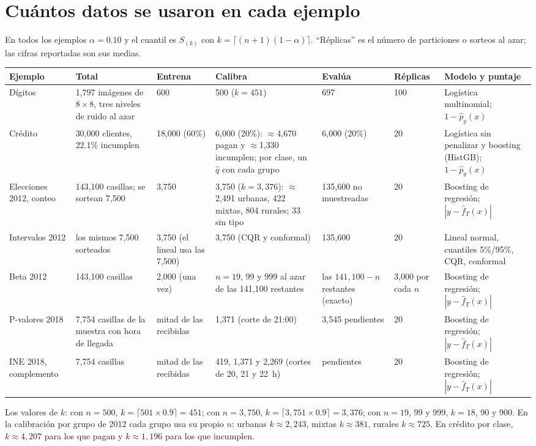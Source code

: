\documentclass[11pt]{article}
\theoremstyle{plain}
\theoremstyle{definition}
\theoremstyle{remark}
\newcommand{\qhat}{\widehat q}
\newcommand{\fhat}{\widehat f_T}
\newcommand{\phat}{\widehat p}
\begin{document}
\section{Cuántos datos se usaron en cada ejemplo}\label{sec:datos}
En todos los ejemplos $\alpha=0.10$ y el cuantil es $S_{(k)}$ con $k=\lceil(n+1)(1-\alpha)\rceil$.
``Réplicas'' es el número de particiones o sorteos al azar; las cifras reportadas son sus medias.
\begin{center}
\footnotesize\renewcommand{\arraystretch}{1.25}\setlength{\tabcolsep}{3pt}
\begin{tabular}{>{\raggedright}p{2.0cm}>{\raggedright}p{2.0cm}>{\raggedright}p{1.5cm}>{\raggedright}p{2.4cm}>{\raggedright}p{1.9cm}>{\raggedright}p{1.2cm}>{\raggedright\arraybackslash}p{2.8cm}}
\toprule
Ejemplo & Total & Entrena & Calibra & Evalúa & Réplicas & Modelo y puntaje\\
\midrule
Dígitos & 1,797 imágenes de $8\times8$, tres niveles de ruido al azar & 600 & 500 (\(k=451\)) & 697 & 100 & Logística multinomial; $1-\phat_y(x)$\\
Crédito & 30,000 clientes, 22.1\% incumplen & 18,000 (60\%) & 6,000 (20\%): $\approx$4,670 pagan y $\approx$1,330 incumplen; por clase, un $\qhat$ con cada grupo & 6,000 (20\%) & 20 & Logística sin penalizar y boosting (HistGB); $1-\phat_y(x)$\\
Elecciones 2012, conteo & 143,100 casillas; se sortean 7,500 & 3,750 & 3,750 (\(k=3{,}376\)): $\approx$2,491 urbanas, 422 mixtas, 804 rurales; 33 sin tipo & 135,600 no muestreadas & 20 & Boosting de regresión; $|y-\fhat(x)|$\\
Intervalos 2012 & los mismos 7,500 sorteados & 3,750 (el lineal usa las 7,500) & 3,750 (CQR y conformal) & 135,600 & 20 & Lineal normal, cuantiles 5\%/95\%, CQR, conformal\\
Beta 2012 & 143,100 casillas & 2,000 (una vez) & $n=19$, 99 y 999 al azar de las 141,100 restantes & las $141{,}100-n$ restantes (exacto) & 3,000 por cada $n$ & Boosting de regresión; $|y-\fhat(x)|$\\
P-valores 2018 & 7,754 casillas de la muestra con hora de llegada & mitad de las recibidas & 1,371 (corte de 21:00) & 3,545 pendientes & 20 & Boosting de regresión; $|y-\fhat(x)|$\\
INE 2018, complemento & 7,754 casillas & mitad de las recibidas & 419, 1,371 y 2,269 (cortes de 20, 21 y 22~h) & pendientes & 20 & Boosting de regresión; $|y-\fhat(x)|$\\
\bottomrule
\end{tabular}
\end{center}
Los valores de $k$: con $n=500$, $k=\lceil501\times0.9\rceil=451$; con $n=3{,}750$,
$k=\lceil3{,}751\times0.9\rceil=3{,}376$; con $n=19$, 99 y 999, $k=18$, 90 y 900. En la calibración
por grupo de 2012 cada grupo usa su propio $n$: urbanas $k\approx2{,}243$, mixtas $k\approx381$,
rurales $k\approx725$. En crédito por clase, $k\approx4{,}207$ para los que pagan y $k\approx1{,}196$
para los que incumplen.
\end{document}
